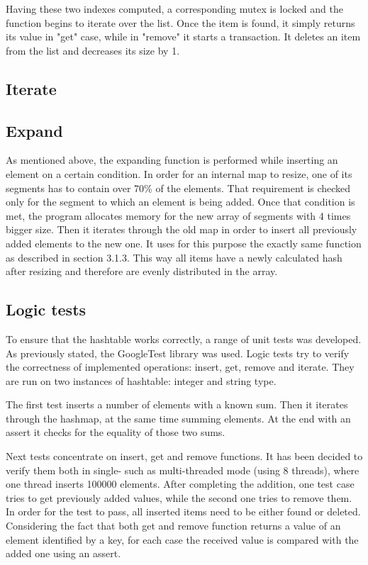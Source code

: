     Having these two indexes computed, a corresponding mutex is locked and the function begins to iterate over the list. Once the item is found, it simply returns its value in "get" case, while in "remove" it starts a transaction. It deletes an item from the list and decreases its size by 1.
        
        
\subsection{Iterate}
    
\subsection{Expand}
    As mentioned above, the expanding function is performed while inserting an element on a certain condition. In order for an internal map to resize, one of its segments has to contain over 70\% of the elements. That requirement is checked only for the segment to which an element is being added. Once that condition is met, the program allocates memory for the new array of segments with 4 times bigger size. Then it iterates through the old map in order to insert all previously added elements to the new one. It uses for this purpose the exactly same function as described in section 3.1.3. This way all items have a newly calculated hash after resizing and therefore are evenly distributed in the array.

\subsection{Logic tests}
    To ensure that the hashtable works correctly, a range of unit tests was developed. As previously stated, the GoogleTest library was used. Logic tests try to verify the correctness of implemented operations: insert, get, remove and iterate. They are run on two instances of hashtable: integer and string type. 
    
    The first test inserts a number of elements with a known sum. Then it iterates through the hashmap, at the same time summing elements. At the end with an assert it checks for the equality of those two sums. 
    
    Next tests concentrate on insert, get and remove functions. It has been decided to verify them both in single- such as multi-threaded mode (using 8 threads), where one thread inserts 100000 elements. After completing the addition, one test case tries to get previously added values, while the second one tries to remove them. In order for the test to pass, all inserted items need to be either found or deleted. Considering the fact that both get and remove function returns a value of an element identified by a key, for each case the received value is compared with the added one using an assert.
    
